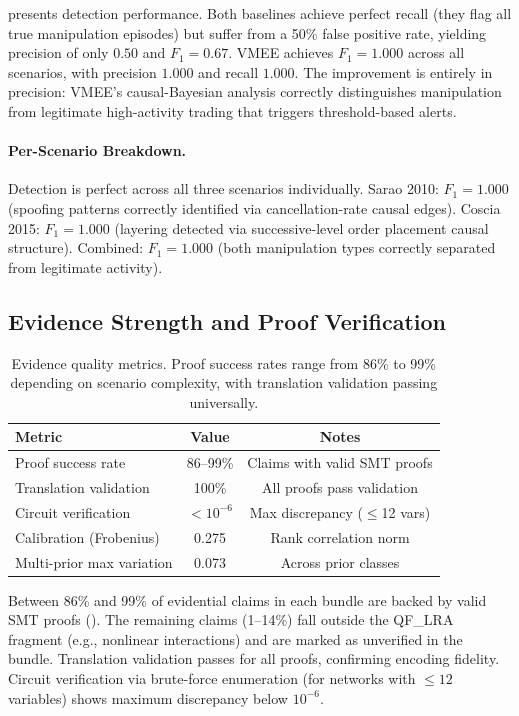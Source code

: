\documentclass[11pt]{article}
\begin{document}
 presents detection performance.
Both baselines achieve perfect recall (they flag all true manipulation episodes) but suffer from a 50\% false positive rate, yielding precision of only $0.50$ and $F_1 = 0.67$.
VMEE achieves $F_1 = 1.000$ across all scenarios, with precision $1.000$ and recall $1.000$.
The improvement is entirely in precision: VMEE's causal-Bayesian analysis correctly distinguishes manipulation from legitimate high-activity trading that triggers threshold-based alerts.

\paragraph{Per-Scenario Breakdown.}
Detection is perfect across all three scenarios individually.
Sarao 2010: $F_1 = 1.000$ (spoofing patterns correctly identified via cancellation-rate causal edges).
Coscia 2015: $F_1 = 1.000$ (layering detected via successive-level order placement causal structure).
Combined: $F_1 = 1.000$ (both manipulation types correctly separated from legitimate activity).

\subsection{Evidence Strength and Proof Verification}

\begin{table}[t]
\centering
\begin{tabular}{@{}lcc@{}}
\toprule
\textbf{Metric} & \textbf{Value} & \textbf{Notes} \\
\midrule
Proof success rate        & 86--99\%   & Claims with valid SMT proofs \\
Translation validation    & 100\%      & All proofs pass validation \\
Circuit verification      & $< 10^{-6}$ & Max discrepancy ($\leq$12 vars) \\
Calibration (Frobenius)   & 0.275      & Rank correlation norm \\
Multi-prior max variation & 0.073      & Across prior classes \\
\bottomrule
\end{tabular}
\caption{Evidence quality metrics. Proof success rates range from 86\% to 99\% depending on scenario complexity, with translation validation passing universally.}
\label{tab:evidence}
\end{table}

Between 86\% and 99\% of evidential claims in each bundle are backed by valid SMT proofs ().
The remaining claims (1--14\%) fall outside the QF\_LRA fragment (e.g., nonlinear interactions) and are marked as unverified in the bundle.
Translation validation passes for all proofs, confirming encoding fidelity.
Circuit verification via brute-force enumeration (for networks with $\leq 12$ variables) shows maximum discrepancy below $10^{-6}$.
\end{document}
